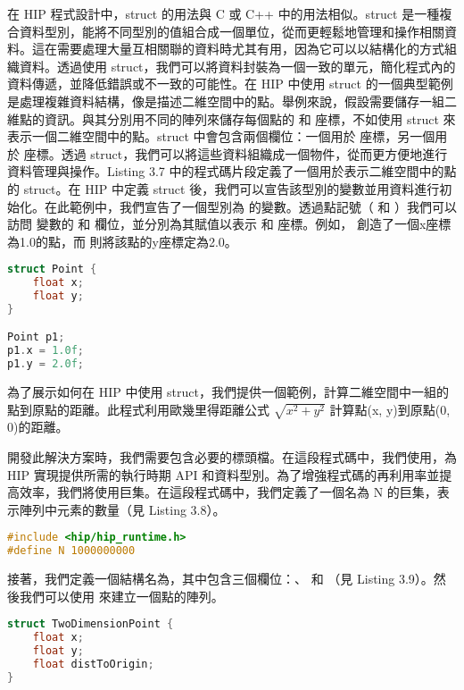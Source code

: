 在 HIP 程式設計中，struct 的用法與 C \cite{41}或 C++ \cite{67}中的用法相似。struct 是一種複合資料型別，能將不同型別的值組合成一個單位，從而更輕鬆地管理和操作相關資料。這在需要處理大量互相關聯的資料時尤其有用，因為它可以以結構化的方式組織資料。透過使用 struct，我們可以將資料封裝為一個一致的單元，簡化程式內的資料傳遞，並降低錯誤或不一致的可能性。在 HIP 中使用 struct 的一個典型範例是處理複雜資料結構，像是描述二維空間中的點。舉例來說，假設需要儲存一組二維點的資訊。與其分別用不同的陣列來儲存每個點的  和  座標，不如使用 struct 來表示一個二維空間中的點。struct 中會包含兩個欄位：一個用於  座標，另一個用於  座標。透過 struct，我們可以將這些資料組織成一個物件，從而更方便地進行資料管理與操作。Listing 3.7 中的程式碼片段定義了一個用於表示二維空間中的點的 struct。在 HIP 中定義 struct 後，我們可以宣告該型別的變數並用資料進行初始化。在此範例中，我們宣告了一個型別為 的變數。透過點記號（ 和 ）我們可以訪問  變數的  和  欄位，並分別為其賦值以表示  和  座標。例如， 創造了一個x座標為1.0的點，而 則將該點的y座標定為2.0。

\begin{lstlisting}[language=C, caption={在HIP kernel中使用結構}, label={7th:example}]
struct Point {
    float x;
    float y;
}

Point p1;
p1.x = 1.0f;
p1.y = 2.0f;
\end{lstlisting}

為了展示如何在 HIP 中使用 struct，我們提供一個範例，計算二維空間中一組的點到原點的距離。此程式利用歐幾里得距離公式 $\sqrt{x^2 + y^2}$ 計算點(x, y)到原點(0, 0)的距離。

開發此解決方案時，我們需要包含必要的標頭檔。在這段程式碼中，我們使用，為 HIP 實現提供所需的執行時期 API 和資料型別。為了增強程式碼的再利用率並提高效率，我們將使用巨集。在這段程式碼中，我們定義了一個名為 N 的巨集，表示陣列中元素的數量（見 Listing 3.8）。

\begin{lstlisting}[language=C, caption={標頭檔與巨集}, label={8th:example}]
#include <hip/hip_runtime.h>
#define N 1000000000
\end{lstlisting}

接著，我們定義一個結構名為，其中包含三個欄位：、 和 （見 Listing 3.9）。然後我們可以使用  來建立一個點的陣列。

\begin{lstlisting}[language=C, caption={在HIP中使用struct}, label={9th:example}]
struct TwoDimensionPoint {
    float x;
    float y;
    float distToOrigin;
}
\end{lstlisting}

